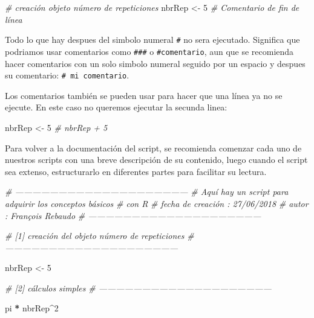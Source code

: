 \documentclass[]{book}
\makeatletter
\newenvironment{Shaded}{\begin{snugshade}}{\end{snugshade}}
\newcommand{\DecValTok}[1]{\textcolor[rgb]{0.00,0.00,0.81}{#1}}
\newcommand{\StringTok}[1]{\textcolor[rgb]{0.31,0.60,0.02}{#1}}
\newcommand{\CommentTok}[1]{\textcolor[rgb]{0.56,0.35,0.01}{\textit{#1}}}
\newcommand{\OperatorTok}[1]{\textcolor[rgb]{0.81,0.36,0.00}{\textbf{#1}}}
\newcommand{\NormalTok}[1]{#1}
\newenvironment{kframe}{%
\medskip{}
\setlength{\fboxsep}{.8em}
 \def\at@end@of@kframe{}%
 \ifinner\ifhmode%
  \def\at@end@of@kframe{\end{minipage}}%
  \begin{minipage}{\columnwidth}%
 \fi\fi%
 \def\FrameCommand##1{\hskip\@totalleftmargin \hskip-\fboxsep
 \colorbox{shadecolor}{##1}\hskip-\fboxsep
     \hskip-\linewidth \hskip-\@totalleftmargin \hskip\columnwidth}%
 \MakeFramed {\advance\hsize-\width
   \@totalleftmargin\z@ \linewidth\hsize
   \@setminipage}}%
 {\par\unskip\endMakeFramed%
 \at@end@of@kframe}
\newenvironment{rmdblock}[1]
  {
  \begin{itemize}
  \renewcommand{\labelitemi}{
    \raisebox{-.7\height}[0pt][0pt]{
      {\setkeys{Gin}{width=3em,keepaspectratio}\texttt{[image: myIcons/\#1]}} %
    }
  }
  \setlength{\fboxsep}{1em}
  \begin{kframe}
  \item
  }
  {
  \end{kframe}
  \end{itemize}
  }
\newenvironment{rmdstyle}     %
  {\begin{rmdblock}{style}}   %
  {\end{rmdblock}}            %
\makeatother
\begin{document}
\begin{Shaded}
\begin{Highlighting}[]
\CommentTok{# creación objeto número de repeticiones}
\NormalTok{nbrRep <-}\StringTok{ }\DecValTok{5} \CommentTok{# Comentario de fin de línea}
\end{Highlighting}
\end{Shaded}

\begin{rmdstyle}
Todo lo que hay despues del simbolo numeral \texttt{\#} no sera
ejecutado. Significa que podriamos usar comentarios como \texttt{\#\#\#}
o \texttt{\#comentario}, aun que se recomienda hacer comentarios con un
solo simbolo numeral seguido por un espacio y despues su comentario:
\texttt{\#\ mi\ comentario}.
\end{rmdstyle}

Los comentarios también se pueden usar para hacer que una línea ya no se
ejecute. En este caso no queremos ejecutar la secunda linea:

\begin{Shaded}
\begin{Highlighting}[]
\NormalTok{nbrRep <-}\StringTok{ }\DecValTok{5}
\CommentTok{# nbrRep + 5}
\end{Highlighting}
\end{Shaded}

Para volver a la documentación del script, se recomienda comenzar cada
uno de nuestros scripts con una breve descripción de su contenido, luego
cuando el script sea extenso, estructurarlo en diferentes partes para
facilitar su lectura.

\begin{Shaded}
\begin{Highlighting}[]
\CommentTok{# ------------------------------------------------------------}
\CommentTok{# Aquí hay un script para adquirir los conceptos básicos}
\CommentTok{# con R}
\CommentTok{# fecha de creación : 27/06/2018}
\CommentTok{# autor : François Rebaudo}
\CommentTok{# ------------------------------------------------------------}

\CommentTok{# [1] creación del objeto número de repeticiones}
\CommentTok{# ------------------------------------------------------------}

\NormalTok{nbrRep <-}\StringTok{ }\DecValTok{5}

\CommentTok{# [2] cálculos simples}
\CommentTok{# ------------------------------------------------------------}

\NormalTok{pi }\OperatorTok{*}\StringTok{ }\NormalTok{nbrRep}\OperatorTok{^}\DecValTok{2}
\end{Highlighting}
\end{Shaded}
\end{document}
